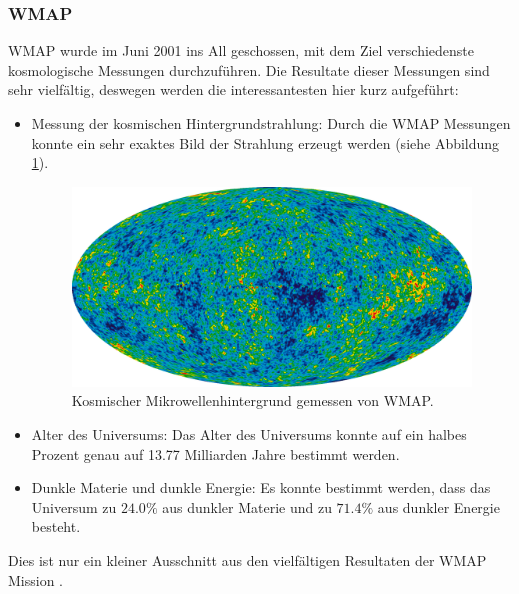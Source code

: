 \subsubsection{\ac{WMAP}}
\ac{WMAP} wurde im Juni 2001 ins All geschossen, mit dem Ziel verschiedenste 
kosmologische Messungen durchzuführen.
Die Resultate dieser Messungen sind sehr vielfältig, deswegen werden die 
interessantesten hier kurz aufgeführt:
\begin{itemize}
	\item Messung der kosmischen Hintergrundstrahlung: Durch die \ac{WMAP} 
	Messungen konnte ein sehr exaktes Bild der Strahlung erzeugt werden (siehe 
	Abbildung \ref{fig:CMB_WMAP}).
	\begin{figure}
		\includegraphics[width=\linewidth]{cmb/images/CMB_WMAP.png}
		\caption{Kosmischer Mikrowellenhintergrund gemessen von \ac{WMAP}.}
		\label{fig:CMB_WMAP}
	\end{figure}
	\item Alter des Universums: Das Alter des Universums konnte auf ein halbes 
	Prozent genau auf 13.77 Milliarden Jahre bestimmt werden.
	\item Dunkle Materie und dunkle Energie: Es konnte bestimmt werden, dass 
	das Universum zu $24.0 \%$ aus dunkler Materie und zu $71.4\%$ aus 
	dunkler Energie besteht.
\end{itemize}
Dies ist nur ein kleiner Ausschnitt aus den vielfältigen Resultaten der 
\ac{WMAP} Mission \cite{cmb:WMAP}.

